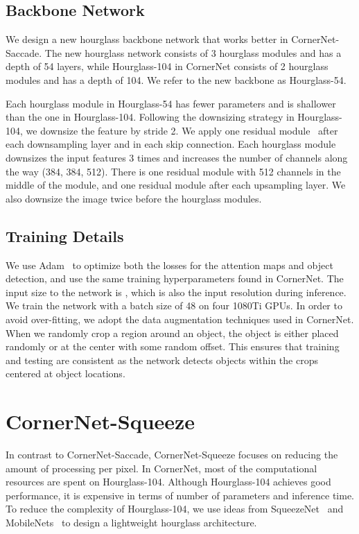 \documentclass{bmvc2k}
\begin{document}
\subsection{Backbone Network}
\label{sec:backbone}
We design a new hourglass backbone network that works better in CornerNet-Saccade. The new hourglass network consists of 3 hourglass modules and has a depth of 54 layers, while Hourglass-104 in CornerNet consists of 2 hourglass modules and has a depth of 104. We refer to the new backbone as Hourglass-54.

Each hourglass module in Hourglass-54 has fewer parameters and is shallower than the one in Hourglass-104. Following the downsizing strategy in Hourglass-104, we downsize the feature by stride 2. We apply one residual module~\cite{he2016deep} after each downsampling layer and in each skip connection. Each hourglass module downsizes the input features 3 times and increases the number of channels along the way (384, 384, 512). There is one residual module with 512 channels in the middle of the module, and one residual module after each upsampling layer. We also downsize the image twice before the hourglass modules.

\subsection{Training Details}
We use Adam~\cite{kingma2014adam} to optimize both the losses for the attention maps and object detection, and use the same training hyperparameters found in CornerNet. The input size to the network is , which is also the input resolution during inference. We train the network with a batch size of 48 on four 1080Ti GPUs. In order to avoid over-fitting, we adopt the data augmentation techniques used in CornerNet. When we randomly crop a region around an object, the object is either placed randomly or at the center with some random offset. This ensures that training and testing are consistent as the network detects objects within the crops centered at object locations.

\section{CornerNet-Squeeze}
In contrast to CornerNet-Saccade, CornerNet-Squeeze focuses on reducing the amount of processing per pixel. In CornerNet, most of the computational resources are spent on Hourglass-104. Although Hourglass-104 achieves good performance, it is expensive in terms of number of parameters and inference time. To reduce the complexity of Hourglass-104, we use ideas from SqueezeNet~\cite{iandola2016squeezenet} and MobileNets~\cite{howard2017mobilenets} to design a lightweight hourglass architecture.
\end{document}

